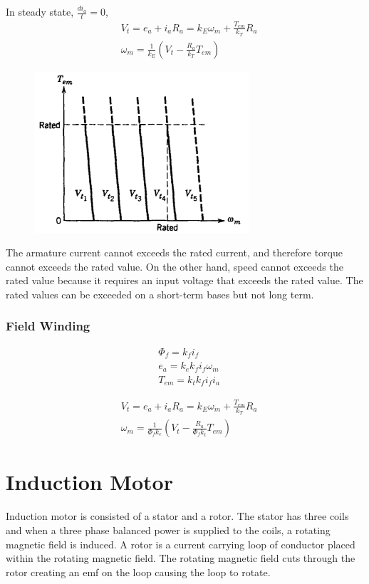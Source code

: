 \documentclass{article}
\begin{document}
    In steady state, $\frac{di_{a}}{t} = 0$, 
    \begin{align*}
        &V_{t} = e_{a} + i_{a}R_{a} = k_{E} \omega_{m} + \frac{T_{em}}{k_{T}} R_{a}\\
        &\omega_{m} = \frac{1}{k_{E}} (V_{t} - \frac{R_{a}}{k_{T}}T_{em})
    \end{align*}

    \begin{figure}[H]
            \centering
            \includegraphics[width=8cm]{figures/t_omega_characteristic_dc.png}
    \end{figure}

        
    The armature current cannot exceeds the rated current, and therefore torque cannot exceeds the 
    rated value. On the other hand, speed cannot exceeds the rated value because it requires an input voltage that 
    exceeds the rated value. The rated values can be exceeded on a short-term bases but not long term.

    \subsubsection*{Field Winding}
        \begin{align*}
            &\Phi_{f} = k_{f}i_{f}\\
            &e_{a} = k_{e} k_{f} i_{f} \omega_{m}\\
            &T_{em} = k_{t} k_{f} i_{f} i_{a}
        \end{align*}

        \begin{align*}
            &V_{t} = e_{a} + i_{a}R_{a} = k_{E} \omega_{m} + \frac{T_{em}}{k_{T}} R_{a}\\
            &\omega_{m} = \frac{1}{\Phi_{f} k_{e}} (V_{t} - \frac{R_{a}}{\Phi_{f}k_{t}}T_{em})
        \end{align*}

    \section*{Induction Motor}        
    Induction motor is consisted of a stator and a rotor. The stator has three coils and when a three phase balanced 
    power is supplied to the coils, a rotating magnetic field is induced. A rotor is a current carrying loop of conductor placed within 
    the rotating magnetic field. The rotating magnetic field cuts through the rotor creating an emf on the loop causing the 
    loop to rotate. \par
\end{document}
